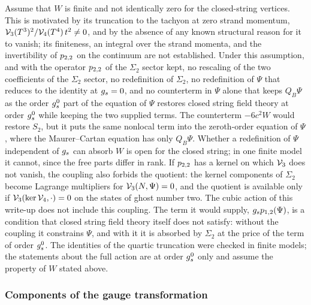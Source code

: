 Assume that $W$ is finite and not identically zero for the closed-string vertices.
This is motivated by its truncation to the tachyon at zero strand momentum, $\mathcal{V}_{3}(T^3)^2 / \mathcal{V}_{4}(T^4) \, t^2 \ne 0$, and by the absence of any known structural reason for it to vanish; its finiteness, an integral over the strand momenta, and the invertibility of $p_{2,2}$ on the continuum are not established.
Under this assumption, and with the operator $p_{2,2}$ of the $\Sigma_2$ sector kept, no rescaling of the two coefficients of the $\Sigma_2$ sector, no redefinition of $\Sigma_2$, no redefinition of $\Psi$ that reduces to the identity at $g_s = 0$, and no counterterm in $\Psi$ alone that keeps $Q_B \Psi$ as the order $g_s^0$ part of the equation of $\Psi$ restores closed string field theory at order $g_s^0$ while keeping the two supplied terms.
The counterterm $- 6 c^2 W$ would restore $S_2$, but it puts the same nonlocal term into the zeroth-order equation of $\Psi$, where the Maurer--Cartan equation has only $Q_B \Psi$.
Whether a redefinition of $\Psi$ independent of $g_s$ can absorb $W$ is open for the closed string; in one finite model it cannot, since the free parts differ in rank.
If $p_{2,2}$ has a kernel on which $\mathcal{V}_{3}$ does not vanish, the coupling also forbids the quotient: the kernel components of $\Sigma_2$ become Lagrange multipliers for $\mathcal{V}_{3}(N, \Psi) = 0$, and the quotient is available only if $\mathcal{V}_{3}(\ker \mathcal{V}_{4}, \cdot) = 0$ on the states of ghost number two.
The cubic action of this write-up does not include this coupling.
The term it would supply, $g_s p_{1,2}(\Psi)$, is a condition that closed string field theory itself does not satisfy: without the coupling it constrains $\Psi$, and with it it is absorbed by $\Sigma_2$ at the price of the term of order $g_s^0$.
The identities of the quartic truncation were checked in finite models; the statements about the full action are at order $g_s^0$ only and assume the property of $W$ stated above.

\subsubsection{Components of the gauge transformation}

